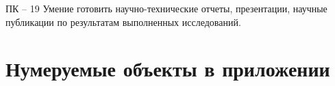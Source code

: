 \documentclass[bachelor, och, coursework, times]{SCWorks}
\begin{document}
ПК – 19 Умение готовить научно-технические отчеты, презентации, научные публикации по результатам выполненных исследований.




%

%






\appendix

\section{Нумеруемые объекты в приложении}
\end{document}
